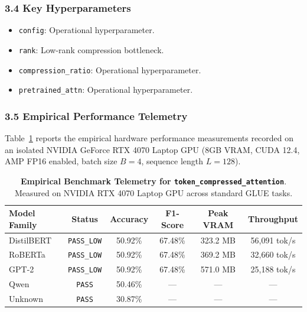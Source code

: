 \subsubsection*{3.4 Key Hyperparameters}
\begin{itemize}
    \item \texttt{config}: Operational hyperparameter.
    \item \texttt{rank}: Low-rank compression bottleneck.
    \item \texttt{compression\_ratio}: Operational hyperparameter.
    \item \texttt{pretrained\_attn}: Operational hyperparameter.
\end{itemize}

\subsubsection*{3.5 Empirical Performance Telemetry}
Table~\ref{tab:telemetry_token_compressed_attention} reports the empirical hardware performance measurements recorded on an isolated NVIDIA GeForce RTX 4070 Laptop GPU (8GB VRAM, CUDA 12.4, AMP FP16 enabled, batch size $B=4$, sequence length $L=128$).

\begin{table}[h]
\centering
\small
\caption{\textbf{Empirical Benchmark Telemetry for \texttt{token\_compressed\_attention}}. Measured on NVIDIA RTX 4070 Laptop GPU across standard GLUE tasks.}
\label{tab:telemetry_token_compressed_attention}
\begin{tabular*}{\columnwidth}{@{\extracolsep{\fill}}lccccc}
\toprule
\textbf{Model Family} & \textbf{Status} & \textbf{Accuracy} & \textbf{F1-Score} & \textbf{Peak VRAM} & \textbf{Throughput} \\
\midrule
DistilBERT & \texttt{PASS\_LOW} & 50.92\% & 67.48\% & 323.2 MB & 56,091 tok/s \\
RoBERTa & \texttt{PASS\_LOW} & 50.92\% & 67.48\% & 369.2 MB & 32,660 tok/s \\
GPT-2 & \texttt{PASS\_LOW} & 50.92\% & 67.48\% & 571.0 MB & 25,188 tok/s \\
Qwen & \texttt{PASS} & 50.46\% & --- & --- & --- \\
Unknown & \texttt{PASS} & 30.87\% & --- & --- & --- \\
\bottomrule
\end{tabular*}
\end{table}


